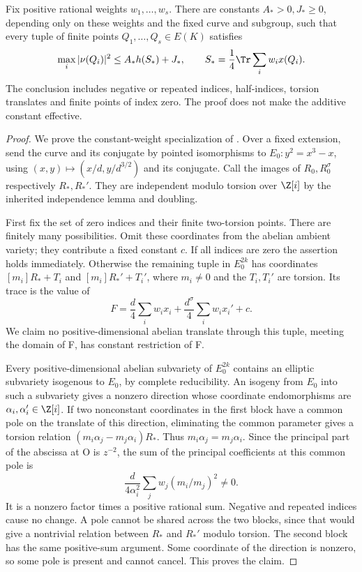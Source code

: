 \begin{theorem}\label{q198:trace-height}
Fix positive rational weights $w_1,\ldots,w_s$. There are constants
$A_*>0,J_*\ge0$, depending only on these weights and the fixed curve
and subgroup, such that every tuple of finite points
$Q_1,\ldots,Q_s\in E(K)$ satisfies
\[
 \max_i|\nu(Q_i)|^2\le A_*h(S_*)+J_*,\qquad
 S_*=\frac14\Tr\sum_i w_ix(Q_i).
\]
The conclusion includes negative or repeated indices, half-indices,
torsion translates and finite points of index zero. The proof does
not make the additive constant effective.
\end{theorem}
\begin{proof}
We prove the constant-weight specialization of
\cite[Theorem 1.1, Lemma 3.1]{q198-BroxWeighted}.
Over a fixed extension, send the curve and its conjugate by pointed
isomorphisms to $E_0:y^2=x^3-x$, using
$(x,y)\mapsto(x/d,y/d^{3/2})$ and its conjugate.
Call the images of $R_0,R_0^\sigma$ respectively $R_*,R_*'$.
They are independent modulo torsion over $\Z[i]$ by the inherited
independence lemma and doubling.

First fix the set of zero indices and their finite two-torsion points.
There are finitely many possibilities. Omit these coordinates from
the abelian ambient variety; they contribute a fixed constant $c$.
If all indices are zero the assertion holds immediately. Otherwise
the remaining tuple in $E_0^{2k}$ has coordinates
$[m_i]R_*+T_i$ and $[m_i]R_*'+T_i'$, where $m_i\ne0$ and the
$T_i,T_i'$ are torsion. Its trace is the value of
\[
 F=\frac d4\sum_iw_ix_i+\frac {d^\sigma}4\sum_iw_ix_i'+c.
\]
We claim no positive-dimensional abelian translate through this tuple,
meeting the domain of F, has constant restriction of F.

Every positive-dimensional abelian subvariety of $E_0^{2k}$ contains
an elliptic subvariety isogenous to $E_0$, by complete reducibility.
An isogeny from $E_0$ into such a subvariety gives a nonzero direction
whose coordinate endomorphisms are $\alpha_i,\alpha_i'\in\Z[i]$.
If two nonconstant coordinates in the first block have a common pole
on the translate of this direction, eliminating the common parameter
gives a torsion relation
$(m_i\alpha_j-m_j\alpha_i)R_*$. Thus
$m_i\alpha_j=m_j\alpha_i$. Since the principal part of the
abscissa at O is $z^{-2}$, the sum of the principal coefficients
at this common pole is
\[
             \frac d{4\alpha_i^2}\sum_jw_j(m_i/m_j)^2\ne0.
\]
It is a nonzero factor times a positive rational sum. Negative and
repeated indices cause no change. A pole cannot be shared across
the two blocks, since that would give a nontrivial relation between
$R_*$ and $R_*'$ modulo torsion. The second block has the same
positive-sum argument. Some coordinate of the direction is nonzero,
so some pole is present and cannot cancel. This proves the claim.


\end{proof}
